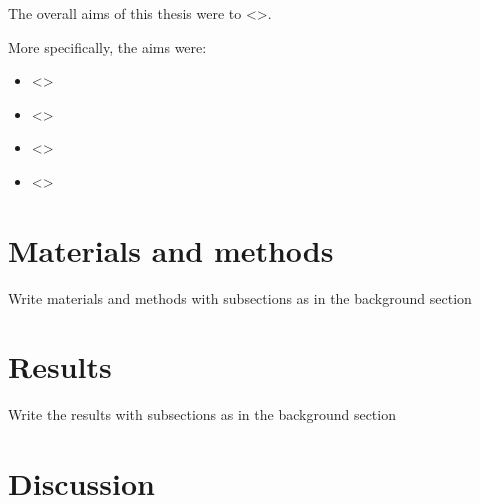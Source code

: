 \documentclass[11pt,a4paper,twoside,openany]{book}\usepackage{knitr}
\begin{document}
{The overall aims of this thesis were to <>.

\bigskip

 More specifically, the aims were:

\begin{itemize}
\item <>

\item <>

\item <>

\item <>
\end{itemize}



%

\chapter{Materials and methods}

Write materials and methods with subsections as in the background section


%

\chapter{Results}

Write the results with subsections as in the background section


%


%

\chapter{Discussion}

}
\end{document}
